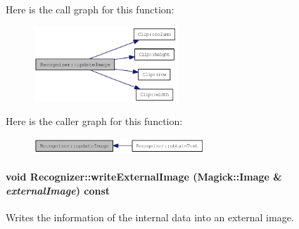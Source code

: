 Here is the call graph for this function:\nopagebreak
\begin{figure}[H]
\begin{center}
\leavevmode
\includegraphics[width=153pt]{class_recognizer_0779d8bb035f7d51cb26fdc3d410e019_cgraph}
\end{center}
\end{figure}


Here is the caller graph for this function:\nopagebreak
\begin{figure}[H]
\begin{center}
\leavevmode
\includegraphics[width=182pt]{class_recognizer_0779d8bb035f7d51cb26fdc3d410e019_icgraph}
\end{center}
\end{figure}
\hypertarget{class_recognizer_559f62a3e3e2d0b799bab38e975b4b67}{
\paragraph[{writeExternalImage}]{\setlength{\rightskip}{0pt plus 5cm}void Recognizer::writeExternalImage (Magick::Image \& {\em externalImage}) const}\hfill}
\label{class_recognizer_559f62a3e3e2d0b799bab38e975b4b67}


Writes the information of the internal data into an external image. 

